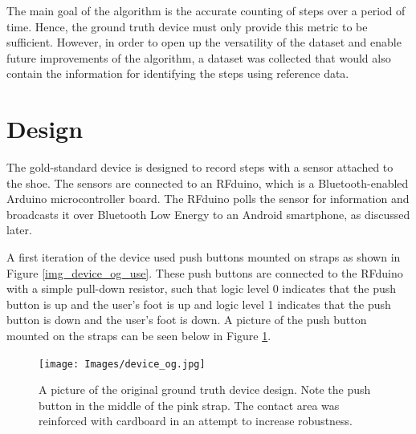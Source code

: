         The main goal of the algorithm is the accurate counting of steps over a period of time. Hence, the ground truth device must only provide this metric to be sufficient. However, in order to open up the versatility of the dataset and enable future improvements of the algorithm, a dataset was collected that would also contain the information for identifying the steps using reference data.

        \section{Design}

            The gold-standard device is designed to record steps with a sensor attached to the shoe. The sensors are connected to an RFduino, which is a Bluetooth-enabled Arduino microcontroller board. The RFduino polls the sensor for information and broadcasts it over Bluetooth Low Energy to an Android smartphone, as discussed later. 

            A first iteration of the device used push buttons mounted on straps as shown in Figure \ref{img_device_og_use}. These push buttons are connected to the RFduino with a simple pull-down resistor, such that logic level 0 indicates that the push button is up and the user's foot is up and logic level 1 indicates that the push button is down and the user's foot is down. A picture of the push button mounted on the straps can be seen below in Figure \ref{img_device_og}.

            \begin{figure}[!th]
                \texttt{[image: Images/device\_og.jpg]}
                \centering
                \caption{A picture of the original ground truth device design. Note the push button in the middle of the pink strap. The contact area was reinforced with cardboard in an attempt to increase robustness.}
                \label{img_device_og}
            \end{figure}

